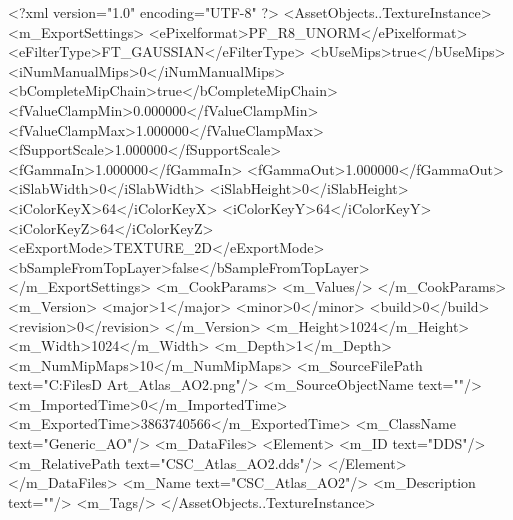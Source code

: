 <?xml version="1.0" encoding="UTF-8" ?>
<AssetObjects..TextureInstance>
	<m_ExportSettings>
		<ePixelformat>PF_R8_UNORM</ePixelformat>
		<eFilterType>FT_GAUSSIAN</eFilterType>
		<bUseMips>true</bUseMips>
		<iNumManualMips>0</iNumManualMips>
		<bCompleteMipChain>true</bCompleteMipChain>
		<fValueClampMin>0.000000</fValueClampMin>
		<fValueClampMax>1.000000</fValueClampMax>
		<fSupportScale>1.000000</fSupportScale>
		<fGammaIn>1.000000</fGammaIn>
		<fGammaOut>1.000000</fGammaOut>
		<iSlabWidth>0</iSlabWidth>
		<iSlabHeight>0</iSlabHeight>
		<iColorKeyX>64</iColorKeyX>
		<iColorKeyY>64</iColorKeyY>
		<iColorKeyZ>64</iColorKeyZ>
		<eExportMode>TEXTURE_2D</eExportMode>
		<bSampleFromTopLayer>false</bSampleFromTopLayer>
	</m_ExportSettings>
	<m_CookParams>
		<m_Values/>
	</m_CookParams>
	<m_Version>
		<major>1</major>
		<minor>0</minor>
		<build>0</build>
		<revision>0</revision>
	</m_Version>
	<m_Height>1024</m_Height>
	<m_Width>1024</m_Width>
	<m_Depth>1</m_Depth>
	<m_NumMipMaps>10</m_NumMipMaps>
	<m_SourceFilePath text="C:\Users\Shadow\Desktop\Working Files\3D Art\Textures\CSC_Atlas_AO2.png"/>
	<m_SourceObjectName text=""/>
	<m_ImportedTime>0</m_ImportedTime>
	<m_ExportedTime>3863740566</m_ExportedTime>
	<m_ClassName text="Generic_AO"/>
	<m_DataFiles>
		<Element>
			<m_ID text="DDS"/>
			<m_RelativePath text="CSC_Atlas_AO2.dds"/>
		</Element>
	</m_DataFiles>
	<m_Name text="CSC_Atlas_AO2"/>
	<m_Description text=""/>
	<m_Tags/>
</AssetObjects..TextureInstance>

